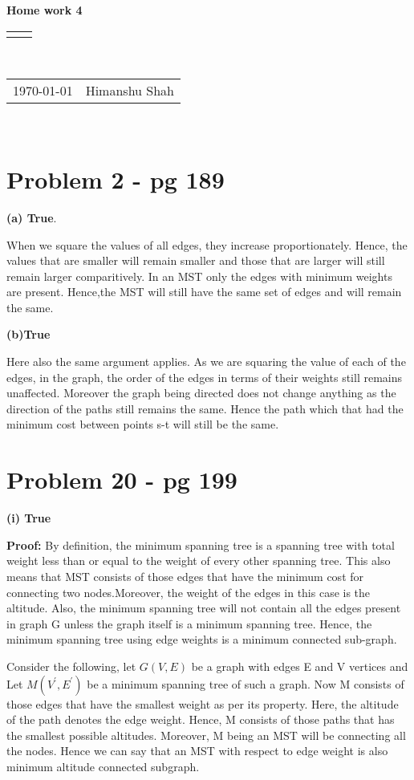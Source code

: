\documentclass[12pt]{article}
\renewcommand{\title}[1]{\textbf{#1}\\}
\renewcommand{\line}{\begin{tabularx}{\textwidth}{X>{\raggedleft}X}\hline\\\end{tabularx}\\[-0.5cm]}
\newcommand{\leftright}[2]{\begin{tabularx}{\textwidth}{X>{\raggedleft}X}#1%
& #2\\\end{tabularx}\\[-0.5cm]}
\begin{document}
\title{Home work 4}
\line
\leftright{\today}{Himanshu Shah} %

\section{Problem 2 - pg 189}
\textbf{(a) True}.

When we square the values of all edges, they increase proportionately. Hence, the values that are smaller will remain smaller and those that are larger will still remain larger comparitively. In an MST only the edges with minimum weights are present. Hence,the MST will still have the same set of edges and will remain the same.

\textbf{(b)True}

Here also the same argument applies. As we are squaring the value of each of the edges, in the graph, the order of the edges in terms of their weights still remains unaffected. Moreover the graph being directed does not change anything as the direction of the paths still remains the same. Hence the path which that had the minimum cost between points s-t will still be the same.  

\section{Problem 20 - pg 199}
\textbf{(i) True}


\textbf{Proof:}
By definition, the minimum spanning tree is a spanning tree with total weight less than or equal to the weight of every other spanning tree. This also means  that MST consists of those edges that have the minimum cost for connecting two nodes.Moreover, the weight of the edges in this case is the altitude. Also, the minimum spanning tree will not contain all the edges present in graph G unless the graph itself is a minimum spanning tree. Hence, the minimum spanning tree using edge weights is a minimum connected sub-graph. 

Consider the following, let $G(V, E)$ be a graph with edges E and V vertices and Let  $M(V^{'}, E^{'})$ be a minimum spanning tree of such a graph. Now M consists of those edges that have the smallest weight as per its property. Here, the altitude of the path denotes the edge weight. Hence, M consists of those paths that has the smallest possible altitudes. Moreover, M being an MST will be connecting all the nodes. Hence we can say that an MST with respect to edge weight is also minimum altitude connected subgraph.
\end{document}
